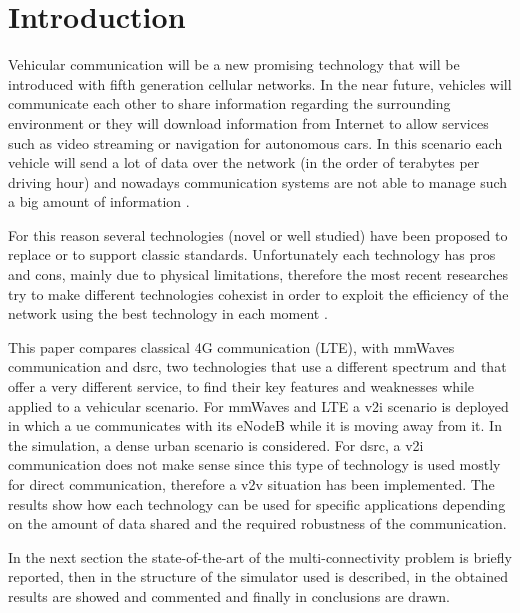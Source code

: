 
\section{Introduction}
\label{sec:introduction}

Vehicular communication will be a new promising technology that will be introduced with fifth generation cellular networks. In the near future, vehicles will communicate each other to share information regarding the surrounding environment or they will download information from Internet to allow services such as video streaming or navigation for autonomous cars.
In this scenario each vehicle will send a lot of data over the network (in the order of terabytes per driving hour) and nowadays communication systems are not able to manage such a big amount of information \cite{Va2016}.

For this reason several technologies (novel or well studied) have been proposed to replace or to support classic standards. Unfortunately each technology has pros and cons, mainly due to physical limitations, therefore the most recent researches try to make different technologies cohexist in order to exploit the efficiency of the network using the best technology in each moment \cite{Giordani16}.

This paper compares classical 4G communication (LTE), with \gls{mmWaves} communication and \gls{dsrc}, two technologies that use a different spectrum and that offer a very different service, to find their key features and weaknesses while applied to a vehicular scenario.
For \gls{mmWaves} and LTE a \gls{v2i} scenario is deployed in which a \gls{ue} communicates with its eNodeB while it is moving away from it. In the simulation, a dense urban scenario is considered.
For \gls{dsrc}, a \gls{v2i} communication does not make sense since this type of technology is used mostly for direct communication, therefore a \gls{v2v} situation has been implemented.
The results show how each technology can be used for specific applications depending on the amount of data shared and the required robustness of the communication.

In the next section the state-of-the-art of the multi-connectivity problem is briefly reported, then in  the structure of the simulator used is described, in  the obtained results are showed and commented and finally in  conclusions are drawn.